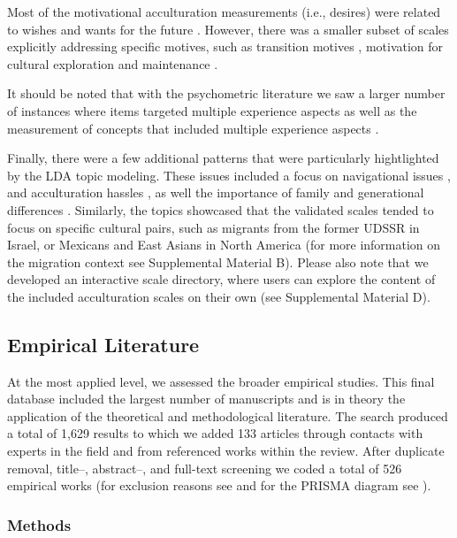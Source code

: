Most of the motivational acculturation measurements (i.e., desires) were
related to wishes and wants for the future
\citep[e.g.,][]{Mancini2014, Ben-Shalom2003}. However, there was a
smaller subset of scales explicitly addressing specific motives, such as
transition motives \citep[][]{Mchitarjan2015}, motivation for cultural
exploration and maintenance \citep[][]{Recker2017}.

It should be noted that with the psychometric literature we saw a larger
number of instances where items targeted multiple experience aspects
\citep[e.g., enjoyment of wearing traditional clothing][]{Ozer2016} as
well as the measurement of concepts that included multiple experience
aspects \citep[e.g., satisfaction][]{Cuellar1995a}.

Finally, there were a few additional patterns that were particularly
hightlighted by the LDA topic modeling. These issues included a focus on
navigational issues \citep[e.g.,][]{Harder2018}, and acculturation
hassles \citep[e.g.,][]{Vinokurov2002}, as well the importance of family
and generational differences \citep[e.g.,][]{ICSEYteam2006, Lee2004b}.
Similarly, the topics showcased that the validated scales tended to
focus on specific cultural pairs, such as migrants from the former UDSSR
in Israel, or Mexicans and East Asians in North America (for more
information on the migration context see Supplemental Material B).
Please also note that we developed an interactive scale directory, where
users can explore the content of the included acculturation scales on
their own (see Supplemental Material D). \color{black}

\subsection{Empirical Literature}

At the most applied level, we assessed the broader empirical studies.
This final database included the largest number of manuscripts and is in
theory the application of the theoretical and methodological literature.
The search produced a total of 1,629 results to which we added 133
articles through contacts with experts in the field and from referenced
works within the review. After duplicate removal, title--, abstract--,
and full-text screening we coded a total of 526 empirical works (for
exclusion reasons see  and for the PRISMA
diagram see ).

\subsubsection{Methods}

